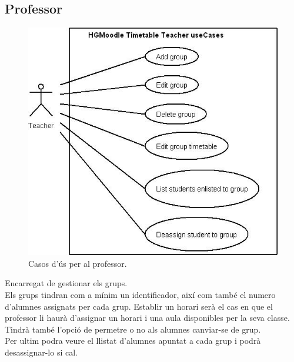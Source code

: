 \documentclass[a4paper]{report}  %
\begin{document}
\subsection{Professor}
		\begin{figure}[H] %
		\begin{center}
		\includegraphics[width=14cm,keepaspectratio]{img/UseCases-Teacher-1r.jpg}
		\caption[List caption]{Casos d'ús per al professor.}
		\label{fig:UseCases-Teacher-1r}
		\end{center}
		\end{figure}
Encarregat de gestionar els grups.\\ 
Els grups tindran com a mínim un identificador, així com també el numero d’alumnes assignats per cada grup. Establir un horari  serà el cas en que el professor li haurà d’assignar un horari i una aula disponibles per la seva classe. Tindrà també l’opció de permetre o no als alumnes canviar-se de grup.\\
Per ultim podra veure el llistat d'alumnes apuntat a cada grup i podrà desassignar-lo si cal.\\
\end{document}
